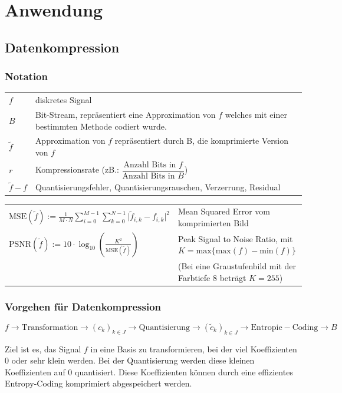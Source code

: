 \section{Anwendung}

\subsection{Datenkompression }

\subsubsection{Notation}
\begin{tabular}{ll}
$f$ & diskretes Signal\\
$B$ & Bit-Stream, repräsentiert eine Approximation von $f$ welches mit einer bestimmten Methode codiert wurde. \\
$\tilde{f}$ & Approximation von $f$ repräsentiert durch B, die komprimierte Version von $f$\\
$r$ & Kompressionsrate (zB.: $\dfrac{\text{Anzahl Bits in }f}{\text{Anzahl Bits in }B}$)\\
$\tilde{f}-f$ & Quantisierungsfehler, Quantisierungsrauschen, Verzerrung, Residual\\
\end{tabular}
\begin{tabular}{ll}
$\mathrm{MSE}(\tilde{f}) := \frac{1}{M \cdot N}\sum_{i=0}^{M-1}\sum_{k=0}^{N-1}\lvert \tilde{f}_{i,k}-f_{i,k} \rvert^2$ & Mean Squared Error vom komprimierten Bild\\
$\mathrm{PSNR}(\tilde{f}) := 10 \cdot \log_{10}(\frac{K^2}{\mathrm{MSE}(\tilde{f})})$ & Peak Signal to Noise Ratio, mit $K=\mathrm{max}\{\mathrm{max}(f)-\mathrm{min}(f)\}$ \\
 &  (Bei eine Graustufenbild mit der Farbtiefe 8 beträgt $K=255$)
\end{tabular}

\subsubsection{Vorgehen für Datenkompression}
\[ 
	f \longrightarrow \boxed{\mathrm{Transformation}} \longrightarrow (c_k)_{k\in J} \longrightarrow \boxed{\mathrm{Quantisierung}} \longrightarrow (\tilde{c}_k)_{k \in J} \longrightarrow \boxed{\mathrm{Entropie-Coding}}\longrightarrow B 
\]

Ziel ist es, das Signal $f$ in eine Basis zu transformieren, bei der viel Koeffizienten 0 oder sehr klein werden. Bei der Quantisierung werden diese kleinen Koeffizienten auf 0 quantisiert. Diese Koeffizienten können durch eine effizientes Entropy-Coding komprimiert abgespeichert werden.\\

